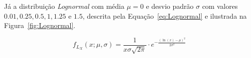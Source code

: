Já a distribuição \textit{Lognormal} com média $ \mu = 0 $ e desvio padrão $\sigma$ com valores $0.01, 0.25, 0.5, 1, 1.25$ e $1.5$, descrita pela Equação~\eqref{eq:Lognormal} e ilustrada na Figura~\ref{fig:Lognormal}.

\begin{equation}
{\displaystyle f_{L_X}(x;\mu ,\sigma )={\frac {1}{x\sigma {\sqrt {2\pi }}}}\cdot e^ {-\frac {\left(\ln(x)-\mu \right)^{2}}{2\sigma ^{2}}}}
\label{eq:Lognormal}
\end{equation}















